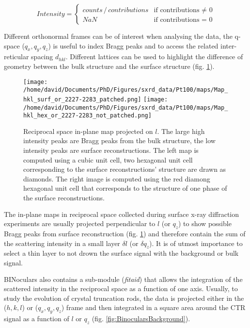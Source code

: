 \begin{equation}
    \label{eq:BinocularsIntensity}
    Intensity =
        \begin{cases}
            counts \, /  \,contributions  & \text{if contributions $\neq$ 0} \\
            NaN & \text{if contributions = 0}
        \end{cases}
\end{equation}

Different orthonormal frames can be of interest when analysing the data, the q-space ($q_x, q_y, q_z$) is useful to index Bragg peaks and to access the related inter-reticular spacing $d_{hkl}$.
Different lattices can be used to highlight the difference of geometry between the bulk structure and the surface structure (fig. \ref{fig:MapExampleBinoculars}).

\begin{figure}[!htb]
    \texttt{[image: /home/david/Documents/PhD/Figures/sxrd\_data/Pt100/maps/Map\_hkl\_surf\_or\_2227-2283\_patched.png]}
    \texttt{[image: /home/david/Documents/PhD/Figures/sxrd\_data/Pt100/maps/Map\_hkl\_hex\_or\_2227-2283\_not\_patched.png]}
    \caption{
    Reciprocal space in-plane map projected on $l$.
    The large high intensity peaks are Bragg peaks from the bulk structure, the low intensity peaks are surface reconstructions.
    The left map is computed using a cubic unit cell, two hexagonal unit cell corresponding to the surface reconstructions' structure are drawn as diamonds.
    The right image is computed using the red diamong hexagonal unit cell that corresponds to the structure of one phase of the surface reconstructions.
    }
    \label{fig:MapExampleBinoculars}
\end{figure}

The in-plane maps in reciprocal space collected during surface x-ray diffraction experiments are usually projected perpendicular to $l$ (or $q_z$) to show possible Bragg peaks from surface reconstruction (fig. \ref{fig:MapExampleBinoculars}) and therefore contain the sum of the scattering intensity in a small layer $\delta l$ (or $\delta q_z$).
It is of utmost importance to select a thin layer to not drown the surface signal with the background or bulk signal.

BINoculars also contains a sub-module (\textit{fitaid}) that allows the integration of the scattered intensity in the reciprocal space as a function of one axis.
Usually, to study the evolution of crystal truncation rods, the data is projected either in the ($h, k, l$) or ($q_x, q_y, q_z$) frame and then integrated in a square area around the CTR signal as a function of $l$ or $q_z$ (fig. \ref{fig:BinocularsBackground}).

